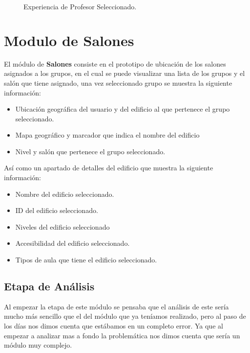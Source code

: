 \begin{figure}[h!]
	\begin{center}
		\caption{Experiencia de Profesor Seleccionado.}
		\label{p2}
	\end{center}
\end{figure}

\section{Modulo de Salones}
El módulo de \textbf{Salones} consiste en el prototipo de ubicación de los salones asignados a los grupos, en el cual se puede visualizar una lista de los grupos y el salón que tiene asignado, una vez seleccionado grupo se muestra la siguiente información:
\begin{itemize}
	\item Ubicación geográfica del usuario y del edificio al que pertenece el grupo seleccionado.
	\item Mapa geográfico y marcador que indica el nombre del edificio
	\item Nivel y salón que pertenece el grupo seleccionado.
\end{itemize}  
Así como un apartado de detalles del edificio que muestra la siguiente información:
\begin{itemize}
	\item Nombre del edificio seleccionado.
	\item ID del edificio seleccionado.
	\item Niveles del edificio seleccionado
	\item Accesibilidad del edificio seleccionado.
	\item Tipos de aula que tiene el edificio seleccionado.
\end{itemize}
\subsection{Etapa de Análisis}
Al empezar la etapa de este módulo se pensaba que el análisis de este sería mucho más sencillo que el del módulo que ya teníamos realizado, pero al paso de los días nos dimos cuenta que estábamos en un completo error. Ya que al empezar a analizar mas a fondo la problemática nos dimos cuenta que sería un módulo muy complejo.\\

